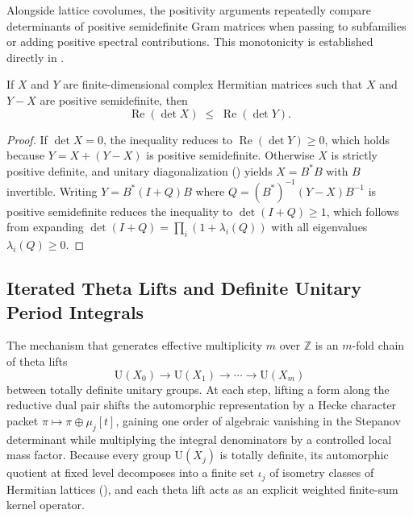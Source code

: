 Alongside lattice covolumes, the positivity arguments repeatedly compare
determinants of positive semidefinite Gram matrices when passing to subfamilies
or adding positive spectral contributions.
This monotonicity is established directly in
.

\begin{proposition}
\label{prop:ch02-det-monotone}
If $X$ and $Y$ are finite-dimensional complex Hermitian matrices such that $X$
and $Y - X$ are positive semidefinite, then
\[
  \operatorname{Re}(\det X) \;\le\; \operatorname{Re}(\det Y).
\]
\end{proposition}

\begin{proof}
If $\det X = 0$, the inequality reduces to $\operatorname{Re}(\det Y) \ge 0$,
which holds because $Y = X + (Y - X)$ is positive semidefinite.
Otherwise $X$ is strictly positive definite, and unitary diagonalization
()
yields $X = B^{*} B$ with $B$ invertible.
Writing $Y = B^{*}(I + Q)B$ where $Q = (B^{*})^{-1}(Y - X)B^{-1}$ is positive
semidefinite reduces the inequality to $\det(I + Q) \ge 1$, which follows from
expanding $\det(I + Q) = \prod_i (1 + \lambda_i(Q))$ with all eigenvalues
$\lambda_i(Q) \ge 0$.
\end{proof}

\subsection{Iterated Theta Lifts and Definite Unitary Period Integrals}
\label{subsec:ch02-iterated-theta-lifts}

The mechanism that generates effective multiplicity $m$ over $\mathbb{Z}$ is
an $m$-fold chain of theta lifts
\[
  \mathrm{U}(X_0) \longrightarrow \mathrm{U}(X_1) \longrightarrow \cdots
  \longrightarrow \mathrm{U}(X_m)
\]
between totally definite unitary groups.
At each step, lifting a form along the reductive dual pair shifts the
automorphic representation by a Hecke character packet
$\pi \mapsto \pi \oplus \mu_j[t]$, gaining one order of algebraic vanishing
in the Stepanov determinant while multiplying the integral denominators by a
controlled local mass factor.
Because every group $\mathrm{U}(X_j)$ is totally definite, its automorphic
quotient at fixed level decomposes into a finite set $\iota_j$ of isometry
classes of Hermitian lattices (),
and each theta lift acts as an explicit weighted finite-sum kernel operator.

